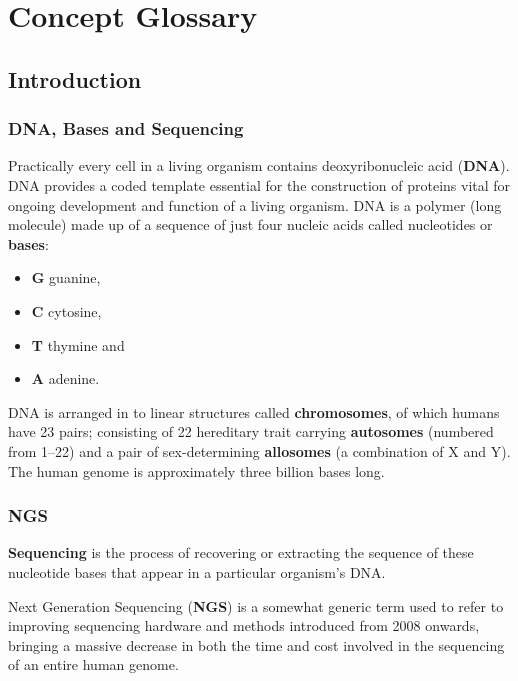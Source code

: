 \chapter{Concept Glossary}
\label{app:concepts}

\section{Introduction}
\label{app:concepts-p0}
\subsection{DNA, Bases and Sequencing}

Practically every cell in a living organism contains deoxyribonucleic acid
(\textbf{DNA}).
DNA provides a coded template essential for the construction of proteins vital
for ongoing development and function of a living organism.
DNA is a polymer (long molecule) made up of a sequence of just four nucleic acids
called nucleotides or \textbf{bases}\citep{HMG-DNA}:

\begin{itemize}
    \item \textbf{G} guanine,
    \item \textbf{C} cytosine,
    \item \textbf{T} thymine and
    \item \textbf{A} adenine.
\end{itemize}

DNA is arranged in to linear structures called \textbf{chromosomes}, of which
humans have 23 pairs; consisting of 22 hereditary trait carrying
\textbf{autosomes} (numbered from 1--22) and a pair of sex-determining
\textbf{allosomes} (a combination of X and Y)\citep{HMG-Chrom}.  The human
genome is approximately three billion bases long.

\subsection{NGS}
\textbf{Sequencing} is the process of recovering or extracting the sequence of
these nucleotide bases that appear in a particular organism's DNA.

Next Generation Sequencing (\textbf{NGS}) is a somewhat generic term used to
refer to improving sequencing hardware and methods introduced from 2008 onwards,
bringing a massive decrease in both the time and cost involved in the sequencing
of an entire human genome\citep{genomegov:costs}.


